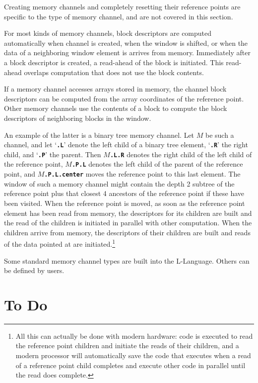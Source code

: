 \documentclass[12pt]{article}
\newcommand{\TT}[1]{{\tt \bfseries #1}}
\begin{document}
Creating memory channels and completely resetting their reference points
are specific to the type of memory channel, and are not covered in
this section.

For most kinds of memory channels, block descriptors are computed
automatically when channel is created, when the window is
shifted, or when the data of
a neighboring window element is arrives from memory.
Immediately after a block descriptor is created, a read-ahead of
the block is initiated.  This read-ahead overlaps computation that
does not use the block contents.

If a memory channel accesses arrays stored in memory,
the channel block descriptors can be computed from the array coordinates
of the reference point.  Other memory channels use the contents
of a block to compute the block descriptors of neighboring blocks
in the window.

An example of the latter is a binary tree memory channel.
Let $M$ be such a channel, and let `\TT{.L}' denote the left
child of a binary tree element, `\TT{.R}' the right child, and
`\TT{.P}' the parent.  Then $M\!$\TT{.L.R} denotes the right
child of the left child of the reference point, $M\!$\TT{.P.L}
denotes the left child of the parent of the reference point,
and $M\!$\TT{.P.L.center} moves the reference point to this last element.
The window of such a memory channel might contain the depth 2
subtree of the reference point plus that closest 4 ancestors of the
reference point if these have been visited.  When the reference
point is moved, as soon as the reference point element has been
read from memory, the descriptors for its children are built and
the read of the children is initiated in parallel with other
computation.  When the children arrive from memory, the descriptors
of their children are built and reads of the data pointed at
are initiated.\footnote{All this can actually be done with modern
hardware: code is executed to read the reference point children and initiate the
reads of their children, and a modern processor will automatically
save the code that
executes when a read of a reference point child completes and execute
other code in parallel until the read does complete.}

Some standard memory channel types are built into the L-Language.
Others can be defined by users.

\section{To Do}
\end{document}
